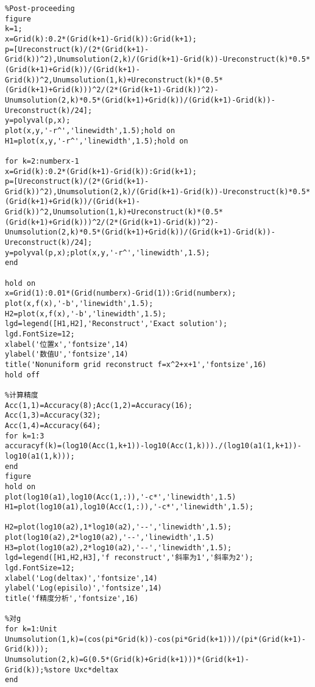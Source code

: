 \documentclass[a4paper,11pt,UTF8]{article}%
\theoremstyle{plain}
\begin{document}
\begin{lstlisting}
%Post-proceeding
figure
k=1;
x=Grid(k):0.2*(Grid(k+1)-Grid(k)):Grid(k+1);
p=[Ureconstruct(k)/(2*(Grid(k+1)-Grid(k))^2),Unumsolution(2,k)/(Grid(k+1)-Grid(k))-Ureconstruct(k)*0.5*(Grid(k+1)+Grid(k))/(Grid(k+1)-Grid(k))^2,Unumsolution(1,k)+Ureconstruct(k)*(0.5*(Grid(k+1)+Grid(k)))^2/(2*(Grid(k+1)-Grid(k))^2)-Unumsolution(2,k)*0.5*(Grid(k+1)+Grid(k))/(Grid(k+1)-Grid(k))-Ureconstruct(k)/24];
y=polyval(p,x);
plot(x,y,'-r^','linewidth',1.5);hold on
H1=plot(x,y,'-r^','linewidth',1.5);hold on
		
for k=2:numberx-1
x=Grid(k):0.2*(Grid(k+1)-Grid(k)):Grid(k+1);
p=[Ureconstruct(k)/(2*(Grid(k+1)-Grid(k))^2),Unumsolution(2,k)/(Grid(k+1)-Grid(k))-Ureconstruct(k)*0.5*(Grid(k+1)+Grid(k))/(Grid(k+1)-Grid(k))^2,Unumsolution(1,k)+Ureconstruct(k)*(0.5*(Grid(k+1)+Grid(k)))^2/(2*(Grid(k+1)-Grid(k))^2)-Unumsolution(2,k)*0.5*(Grid(k+1)+Grid(k))/(Grid(k+1)-Grid(k))-Ureconstruct(k)/24];
y=polyval(p,x);plot(x,y,'-r^','linewidth',1.5);
end
		
hold on
x=Grid(1):0.01*(Grid(numberx)-Grid(1)):Grid(numberx);
plot(x,f(x),'-b','linewidth',1.5);
H2=plot(x,f(x),'-b','linewidth',1.5);
lgd=legend([H1,H2],'Reconstruct','Exact solution');
lgd.FontSize=12;
xlabel('位置x','fontsize',14)
ylabel('数值U','fontsize',14)
title('Nonuniform grid reconstruct f=x^2+x+1','fontsize',16)
hold off
		
%计算精度
Acc(1,1)=Accuracy(8);Acc(1,2)=Accuracy(16);
Acc(1,3)=Accuracy(32);
Acc(1,4)=Accuracy(64);
for k=1:3
accuracyf(k)=(log10(Acc(1,k+1))-log10(Acc(1,k)))./(log10(a1(1,k+1))-log10(a1(1,k)));
end
figure
hold on
plot(log10(a1),log10(Acc(1,:)),'-c*','linewidth',1.5)
H1=plot(log10(a1),log10(Acc(1,:)),'-c*','linewidth',1.5);
		
H2=plot(log10(a2),1*log10(a2),'--','linewidth',1.5);
plot(log10(a2),2*log10(a2),'--','linewidth',1.5)
H3=plot(log10(a2),2*log10(a2),'--','linewidth',1.5);
lgd=legend([H1,H2,H3],'f reconstruct','斜率为1','斜率为2');
lgd.FontSize=12;
xlabel('Log(deltax)','fontsize',14)
ylabel('Log(episilo)','fontsize',14)
title('f精度分析','fontsize',16)
		
%对g
for k=1:Unit
Unumsolution(1,k)=(cos(pi*Grid(k))-cos(pi*Grid(k+1)))/(pi*(Grid(k+1)-Grid(k)));
Unumsolution(2,k)=G(0.5*(Grid(k)+Grid(k+1)))*(Grid(k+1)-Grid(k));%store Uxc*deltax
end
		

\end{lstlisting}
\end{document}
